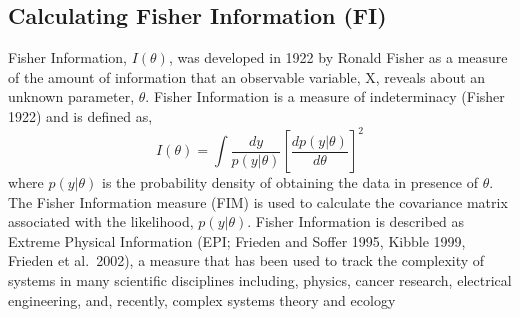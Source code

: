 \documentclass[12pt,twoside,openany]{reedthesis}
\begin{document}
\hypertarget{calculating-fisher-information-fi}{%
\subsection{Calculating Fisher Information (FI)}\label{calculating-fisher-information-fi}}

Fisher Information, \(I(\theta)\), was developed in 1922 by Ronald Fisher as a measure of the amount of information that an observable variable, X, reveals about an unknown parameter, \(\theta\). Fisher Information is a measure of indeterminacy (Fisher 1922) and is defined as,
\begin{equation} 
  I(\theta) = \int \frac{dy}{p(y|\theta)}\left[\frac{dp(y|\theta)}{d\theta}\right]^2
  \label{eq:fiGeneral1922}
\end{equation}
where \(p(y|\theta)\) is the probability density of obtaining the data in presence of \(\theta\). The Fisher Information measure (FIM) is used to calculate the covariance matrix associated with the likelihood, \(p(y|\theta)\). Fisher Information is described as Extreme Physical Information (EPI; Frieden and Soffer 1995, Kibble 1999, Frieden et al.~2002), a measure that has been used to track the complexity of systems in many scientific disciplines including, physics, cancer research, electrical engineering, and, recently, complex systems theory and ecology
\end{document}
